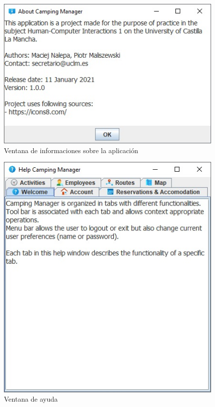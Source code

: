 \documentclass[a4paper]{article}
\begin{document}
\begin{figure}[h]
\includegraphics[width=\textwidth]{img/about.jpg}
\caption{Ventana de informaciones sobre la aplicación}
\end{figure}

\begin{figure}[h]
\includegraphics[width=\textwidth]{img/help.jpg}
\caption{Ventana de ayuda}
\end{figure}
\end{document}
